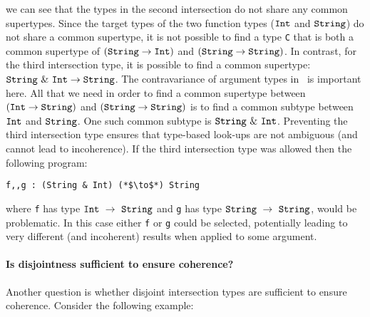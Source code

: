\noindent we can see that the types in the 
second intersection do not share any common supertypes. Since the
target types of the two function types
($\texttt{Int}$ and $\texttt{String}$) do not share a common
supertype, 
it is not possible to find a type \lstinline$C$ that is both a common
supertype of $(\texttt{String} \to \texttt{Int})$ and $(\texttt{String} \to \texttt{String})$.
In contrast, for the third intersection type, it is possible to find a 
common supertype: $\texttt{String}~\&~\texttt{Int} \to
\texttt{String}$. The contravariance of argument types
in ~is important here. All that we need in order to find a common supertype 
between $(\texttt{Int} \to \texttt{String})$ and $(\texttt{String} \to
\texttt{String})$ is to find a common subtype between $\texttt{Int}$ and 
$\texttt{String}$. One such common subtype is
$\texttt{String}~\&~\texttt{Int}$. Preventing the third intersection
type ensures that type-based look-ups are not ambiguous (and cannot
lead to incoherence). If the third intersection type was allowed then
the following program:

\begin{lstlisting}
f,,g : (String & Int) (*$\to$*) String
\end{lstlisting}

\noindent where \lstinline$f$ has type
$\texttt{Int}~\to~\texttt{String}$  and \lstinline$g$ has type
$\texttt{String}~\to~\texttt{String}$, would be problematic. In this 
case either \lstinline$f$ or \lstinline$g$ could be selected,
potentially leading to very different (and incoherent) results when
applied to some argument. 

\begin{comment}
According to the rule the first 
two intersection types are disjoint, whereas the last one is not. This 
rule is justified in Section~\ref{}.\bruno{Should we stop here; or briefly argue 
about some justification} 

This paper proposes the 
following rule for determining the disjointness of two function types:

\begin{mathpar}
    \ruledisfun
\end{mathpar}

\noindent Here $*_i$ denotes disjointness. 
\end{comment}

\paragraph {Is disjointness sufficient to ensure coherence?} Another question
is whether disjoint intersection types are sufficient to ensure coherence. 
Consider the following example:

